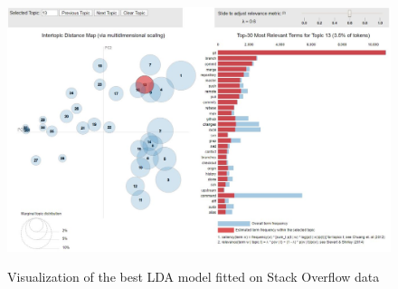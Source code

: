             \begin{figure}
              \centering
              \includegraphics[width=\textwidth]{figures/pyLDAviz_SO.JPG}\\
              \caption{Visualization of the best LDA model fitted on Stack Overflow data}
              \label{fig:pyldaviz_SO}
            \end{figure}
    
    
    
    
    
    
    
    
    
    
    
    
